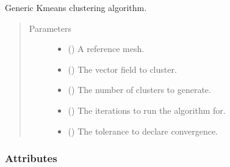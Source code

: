 \documentclass[letterpaper,10pt,english]{sphinxmanual}
\begin{document}
\begin{fulllineitems}
\label{\detokenize{api/generated/directional_clustering.clustering.KMeans:directional_clustering.clustering.KMeans}}
Generic K\sphinxhyphen{}means clustering algorithm.
\begin{quote}\begin{description}
\item[{Parameters}] \leavevmode\begin{itemize}
\item {} 
 () \textendash{} A reference mesh.

\item {} 
 () \textendash{} The vector field to cluster.

\item {} 
 () \textendash{} The number of clusters to generate.

\item {} 
 () \textendash{} The iterations to run the algorithm for.

\item {} 
 () \textendash{} The tolerance to declare convergence.

\end{itemize}

\end{description}\end{quote}
\subsubsection*{Attributes}


\begin{savenotes}\sphinxatlongtablestart\begin{longtable}[c]{}
\hline

\endfirsthead

%
{}\\
\hline


\end{longtable}
\end{savenotes}
\end{fulllineitems}
\end{document}
